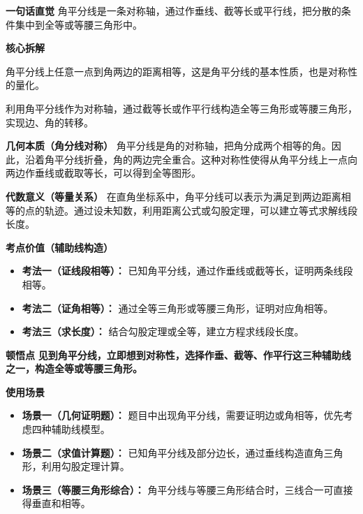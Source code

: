 \begin{explanationbox}
	\textbf{\textcolor{CExplanation}{一句话直觉}}
	角平分线是一条对称轴，通过作垂线、截等长或平行线，把分散的条件集中到全等或等腰三角形中。

	\medskip
	\textbf{\textcolor{CExplanation}{核心拆解}}
	\begin{description}[style=nextline, leftmargin=2.8em, labelsep=0.5em, itemsep=0.45em]
		\item[\textbf{要点一（对称性质）：}]
			角平分线上任意一点到角两边的距离相等，这是角平分线的基本性质，也是对称性的量化。
		\item[\textbf{要点二（构造全等）：}]
			利用角平分线作为对称轴，通过截等长或作平行线构造全等三角形或等腰三角形，实现边、角的转移。
	\end{description}

	\medskip
	\textbf{\textcolor{CExplanation}{几何本质（角分线对称）}}
	角平分线是角的对称轴，把角分成两个相等的角。因此，沿着角平分线折叠，角的两边完全重合。这种对称性使得从角平分线上一点向两边作垂线或截取等长，可以得到全等图形。

	\medskip
	\textbf{\textcolor{CExplanation}{代数意义（等量关系）}}
	在直角坐标系中，角平分线可以表示为满足到两边距离相等的点的轨迹。通过设未知数，利用距离公式或勾股定理，可以建立等式求解线段长度。

	\medskip
	\textbf{\textcolor{CExplanation}{考点价值（辅助线构造）}}
	\begin{itemize}[leftmargin=*, itemsep=0.5em, topsep=0.4em]
		\item \textbf{考法一（证线段相等）：} 已知角平分线，通过作垂线或截等长，证明两条线段相等。
		\item \textbf{考法二（证角相等）：} 通过全等三角形或等腰三角形，证明对应角相等。
		\item \textbf{考法三（求长度）：} 结合勾股定理或全等，建立方程求线段长度。
	\end{itemize}

	\medskip
	\textbf{\textcolor{CExplanation}{顿悟点}}
	\textbf{见到角平分线，立即想到对称性，选择作垂、截等、作平行这三种辅助线之一，构造全等或等腰三角形。}

	\medskip
	\textbf{\textcolor{CExplanation}{使用场景}}
	\begin{itemize}[leftmargin=*, itemsep=0.5em, topsep=0.4em]
		\item \textbf{场景一（几何证明题）：} 题目中出现角平分线，需要证明边或角相等，优先考虑四种辅助线模型。
		\item \textbf{场景二（求值计算题）：} 已知角平分线及部分边长，通过垂线构造直角三角形，利用勾股定理计算。
		\item \textbf{场景三（等腰三角形综合）：} 角平分线与等腰三角形结合时，三线合一可直接得垂直和相等。
	\end{itemize}

\end{explanationbox}
